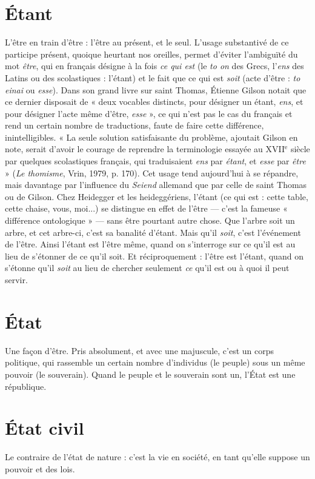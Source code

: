 \section{Étant}
L'être en train d’être : l'être au présent, et le seul. L’usage substantivé
de ce participe présent, quoique heurtant nos oreilles, permet
d'éviter l'ambiguïté du mot {\it être}, qui en français désigne à la fois {\it ce qui est} (le {\it to
on} des Grecs, l’{\it ens} des Latins ou des scolastiques : l’étant) et le fait que ce qui
est {\it soit} (acte d’être : {\it to einai} ou {\it esse}). Dans son grand livre sur saint Thomas,
Étienne Gilson notait que ce dernier disposait de « deux vocables distincts,
pour désigner un étant, {\it ens}, et pour désigner l’acte même d’être, {\it esse} », ce qui
n'est pas le cas du français et rend un certain nombre de traductions, faute de
faire cette différence, inintelligibles. « La seule solution satisfaisante du problème,
ajoutait Gilson en note, serait d’avoir le courage de reprendre la terminologie
essayée au {\footnotesize XVII$^\text{e}$} siècle par quelques scolastiques français, qui traduisaient
{\it ens} par {\it étant}, et {\it esse} par {\it être} » ({\it Le thomisme}, Vrin, 1979, p. 170). Cet
usage tend aujourd’hui à se répandre, mais davantage par l'influence du {\it Seiend}
allemand que par celle de saint Thomas ou de Gilson. Chez Heidegger et les
heideggériens, l’étant (ce qui est : cette table, cette chaise, vous, moi...) se distingue
en effet de l’être — c’est la fameuse « différence ontologique » — sans être
pourtant autre chose. Que l'arbre soit un arbre, et cet arbre-ci, c’est sa banalité
d’étant. Mais qu’il {\it soit}, c’est l'événement de l'être. Ainsi l’étant est l’être même,
quand on s'interroge sur ce qu’il est au lieu de s'étonner de ce qu’il soit. Et
réciproquement : l’être est l’étant, quand on s’étonne qu’il {\it soit} au lieu de chercher
seulement {\it ce} qu’il est ou à quoi il peut servir.

\section{État}
Une façon d’être. Pris absolument, et avec une majuscule, c’est un
corps politique, qui rassemble un certain nombre d'individus (le
peuple) sous un même pouvoir (le souverain). Quand le peuple et le souverain
sont un, l’État est une république.

\section{État civil}
Le contraire de l’état de nature : c’est la vie en société, en tant
qu’elle suppose un pouvoir et des lois.


